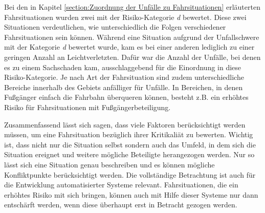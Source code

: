 Bei den in Kapitel \ref{section:Zuordnung der Unfälle zu Fahrsituationen} erläuterten Fahrsituationen wurden zwei mit der Risiko-Kategorie \textit{d} bewertet. Diese zwei Situationen verdeutlichen, wie unterschiedlich die Folgen verschiedener Fahrsituationen sein können. Während eine Situation aufgrund der Unfallschwere mit der Kategorie \textit{d} bewertet wurde, kam es bei einer anderen lediglich zu einer geringen Anzahl an Leichtverletzten. Dafür war die Anzahl der Unfälle, bei denen es zu einem Sachschaden kam, ausschlaggebend für die Einordnung in diese Risiko-Kategorie. Je nach Art der Fahrsituation sind zudem unterschiedliche Bereiche innerhalb des Gebiets anfälliger für Unfälle. In Bereichen, in denen Fußgänger einfach die Fahrbahn überqueren können, besteht z.B. ein erhöhtes Risiko für Fahrsituationen mit Fußgängerbeteiligung.

Zusammenfassend lässt sich sagen, dass viele Faktoren berücksichtigt werden müssen, um eine Fahrsituation bezüglich ihrer Kritikaliät zu bewerten. Wichtig ist, dass nicht nur die Situation selbst sondern auch das Umfeld, in dem sich die Situation ereignet und weitere mögliche Beteiligte herangezogen werden. Nur so lässt sich eine Situation genau beschreiben und es können mögliche Konfliktpunkte berücksichtigt werden. Die vollständige Betrachtung ist auch für die Entwicklung automatisierter Systeme relevant. Fahrsituationen, die ein erhöhtes Risiko mit sich bringen, können auch mit Hilfe dieser Systeme nur dann entschärft werden, wenn diese überhaupt erst in Betracht gezogen werden.